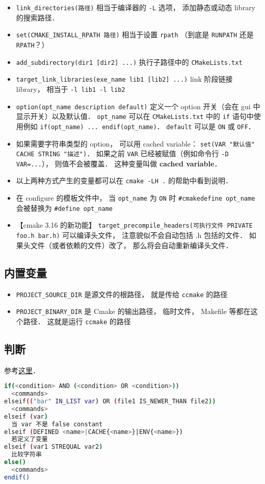 \begin{itemize}
\item \verb|link_directories(路径)| 相当于编译器的 \verb`-L` 选项， 添加静态或动态 library 的搜索路径．
\item \verb|set(CMAKE_INSTALL_RPATH 路径)| 相当于设置 \verb|rpath| （到底是 \verb|RUNPATH| 还是 \verb|RPATH|？）
\item \verb`add_subdirectory(dir1 [dir2] ...)` 执行子路径中的 \verb|CMakeLists.txt|
\item \verb`target_link_libraries(exe_name lib1 [lib2] ...)` link 阶段链接 library， 相当于 \verb|-l lib1 -l lib2|
\item \verb`option(opt_name description default)` 定义一个 option 开关（会在 gui 中显示开关）以及默认值． \verb`opt_name` 可以在 \verb|CMakeLists.txt| 中的 \verb`if` 语句中使用例如 \verb`if(opt_name) ... endif(opt_name)`． \verb`default` 可以是 \verb`ON` 或 \verb`OFF`．
\item 如果需要字符串类型的 option， 可以用 cached variable： \verb|set(VAR "默认值" CACHE STRING "描述")|． 如果之前 \verb|VAR| 已经被赋值（例如命令行 \verb|-D VAR=...|）， 则值不会被覆盖． 这种变量叫做 \textbf{cached variable}．
\item 以上两种方式产生的变量都可以在 \verb|cmake -LH .| 的帮助中看到说明．
\item 在 configure 的模板文件中， 当 \verb`opt_name` 为 \verb`ON` 时 \verb`#cmakedefine opt_name` 会被替换为 \verb`#define opt_name`
\item 【cmake 3.16 的新功能】 \verb|target_precompile_headers(可执行文件 PRIVATE foo.h bar.h)| 可以编译头文件， 注意貌似不会自动包括 .h 包括的文件． 如果头文件（或者依赖的文件）改了， 那么将会自动重新编译头文件．
\end{itemize}

\subsection{内置变量}
\begin{itemize}
\item \verb`PROJECT_SOURCE_DIR` 是源文件的根路径， 就是传给 \verb`ccmake` 的路径
\item \verb`PROJECT_BINARY_DIR` 是 Cmake 的输出路径， 临时文件， Makefile 等都在这个路径． 这就是运行 \verb`ccmake` 的路径
\end{itemize}

\subsection{判断}
参考\href{https://cmake.org/cmake/help/latest/command/if.html}{这里}．
\begin{lstlisting}[language=bash]
if(<condition> AND (<condition> OR <condition>))
  <commands>
elseif(("bar" IN_LIST var) OR (file1 IS_NEWER_THAN file2))
  <commands>
elseif (var)
  当 var 不是 false constant
elseif (DEFINED <name>|CACHE{<name>}|ENV{<name>})
  若定义了变量
elseif (var1 STREQUAL var2)
  比较字符串
else()
  <commands>
endif()
\end{lstlisting}


